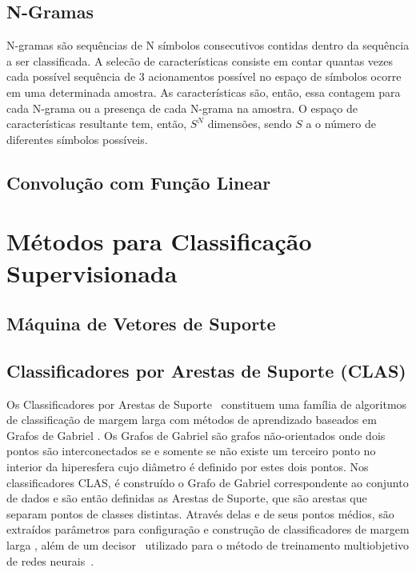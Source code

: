 \documentclass[
	12pt,				%
	openright,			%
	twoside,			%
	a4paper,			%
	english,			%
	spanish,			%
	brazil,				%
	]{abntex2}\usepackage[]{graphicx}\usepackage[]{color}
\begin{document}
\subsection{N-Gramas}
\label{subngramas}

N-gramas \cite{Xing2010} são sequências de N símbolos consecutivos contidas dentro da sequência a ser classificada. A selecão de características consiste em contar quantas vezes cada possível sequência de 3 acionamentos possível no espaço de símbolos ocorre em uma determinada amostra. As características são, então, essa contagem para cada N-grama ou a presença de cada N-grama na amostra. O espaço de características resultante tem, então, $S^N$ dimensões, sendo $S$ a o número de diferentes símbolos possíveis.


\subsection{Convolução com Função Linear}
\label{subconvo}


\section{Métodos para Classificação Supervisionada}

\subsection{Máquina de Vetores de Suporte}


\subsection{Classificadores por Arestas de Suporte (CLAS)}

Os Classificadores por Arestas de Suporte~\cite{Torres2016} constituem uma família de algoritmos de classificação de margem larga com métodos de aprendizado baseados em Grafos de Gabriel \cite{Gabriel1969}. Os Grafos de Gabriel são grafos não-orientados onde dois pontos são interconectados se e somente se não existe um terceiro ponto no interior da hiperesfera cujo diâmetro é definido por estes dois pontos. Nos classificadores CLAS, é construído o Grafo de Gabriel correspondente ao conjunto de dados e são então definidas as Arestas de Suporte, que são arestas que separam pontos de classes distintas. Através delas e de seus pontos médios, são extraídos parâmetros para configuração e construção de classificadores de margem larga \cite{Torres2014} \cite{Torres20152} \cite{Coelho2015}, além de um decisor~\cite{Torres2012} utilizado para o método de treinamento multiobjetivo de redes neurais~\cite{Albuquerque2000}.
\end{document}
